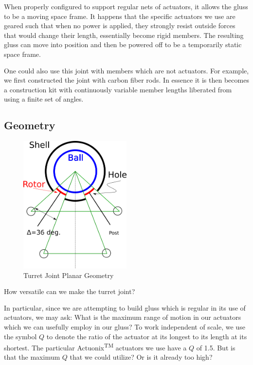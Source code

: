 \documentclass[11pt]{article}
\begin{document}
When properly configured to support regular nets of actuators,
it allows the gluss to be a moving space frame. It happens that the specific actuators we use
are geared such that when no power is applied, they strongly resist outside forces that would change their length,
essentially become rigid members.
The resulting gluss
can move into position and then be powered off to be a temporarily static space frame.

One could also use this joint with members which are not actuators. For example, we first
constructed the joint with carbon fiber rods. In essence it is then becomes a construction kit with continuously
variable member lengths liberated from using a finite set of angles.

\subsection{Geometry}

\begin{figure}[H]
  \centering
  \includegraphics[width=0.5\textwidth]{figures/SimplifiedConstraintDrawing.png}
    \caption[Turret Joint Planar Geometry]{Turret Joint Planar Geometry}
      \label{simplified-constraint-drawing}
\end{figure}

How versatile can we make the turret joint?

In particular, since we are attempting to build gluss which is regular in its use of actuators, we may ask:
What is the maximum range of motion in our
actuators which we can usefully employ in our gluss?
To work independent of scale, we use the symbol $Q$ to denote the ratio of the actuator at its
longest to its length at its shortest.
The particular Actuonix\textsuperscript{TM} actuators we use have a $Q$ of 1.5. But is that the maximum $Q$ that we could utilize? Or is
it already too high?
\end{document}
